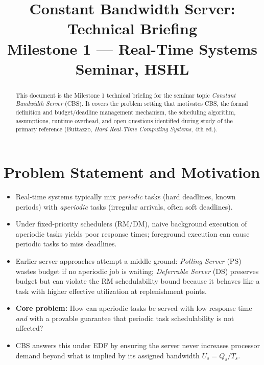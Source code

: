 \documentclass[conference]{IEEEtran}
\begin{document}
\title{Constant Bandwidth Server: Technical Briefing\\
{\footnotesize Milestone 1 --- Real-Time Systems Seminar, HSHL}}

\author{
}

\maketitle

\begin{abstract}
This document is the Milestone 1 technical briefing for the seminar
topic \emph{Constant Bandwidth Server} (CBS). It covers the problem
setting that motivates CBS, the formal definition and budget/deadline
management mechanism, the scheduling algorithm, assumptions, runtime
overhead, and open questions identified during study of the primary
reference (Buttazzo, \textit{Hard Real-Time Computing Systems}, 4th ed.).
\end{abstract}

\section{Problem Statement and Motivation}

\begin{itemize}
  \item Real-time systems typically mix \emph{periodic} tasks (hard
        deadlines, known periods) with \emph{aperiodic} tasks (irregular
        arrivals, often soft deadlines).
  \item Under fixed-priority schedulers (RM/DM), naive background
        execution of aperiodic tasks yields poor response times;
        foreground execution can cause periodic tasks to miss deadlines.
  \item Earlier server approaches attempt a middle ground:
        \emph{Polling Server} (PS) wastes budget if no aperiodic job is
        waiting; \emph{Deferrable Server} (DS) preserves budget but can
        violate the RM schedulability bound because it behaves like a
        task with higher effective utilization at replenishment points.
  \item \textbf{Core problem:} How can aperiodic tasks be served with
        low response time \emph{and} with a provable guarantee that
        periodic task schedulability is not affected?
  \item CBS answers this under EDF by ensuring the server never
        increases processor demand beyond what is implied by its
        assigned bandwidth $U_s = Q_s / T_s$.
\end{itemize}
\end{document}
